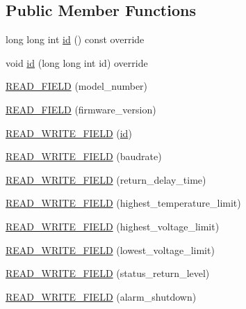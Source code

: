 \subsection*{Public Member Functions}
\begin{DoxyCompactItemize}
\item 
long long int \hyperlink{classdynamixel_1_1servos_1_1_servo_a2d022081672e25a7bb57b76706e1cc57}{id} () const override
\item 
void \hyperlink{classdynamixel_1_1servos_1_1_servo_a866e0cdb2ee9f3c622305634368b18f2}{id} (long long int id) override
\item 
\hyperlink{classdynamixel_1_1servos_1_1_servo_a1e066990c79024cc63d7e5ac53fcf51b}{R\+E\+A\+D\+\_\+\+F\+I\+E\+L\+D} (model\+\_\+number)
\item 
\hyperlink{classdynamixel_1_1servos_1_1_servo_a1331b1d5876dc2bc640194aff7d5be34}{R\+E\+A\+D\+\_\+\+F\+I\+E\+L\+D} (firmware\+\_\+version)
\item 
\hyperlink{classdynamixel_1_1servos_1_1_servo_a6ac8b76a420b2b576231f71bd5c0c3bb}{R\+E\+A\+D\+\_\+\+W\+R\+I\+T\+E\+\_\+\+F\+I\+E\+L\+D} (\hyperlink{classdynamixel_1_1servos_1_1_servo_a2d022081672e25a7bb57b76706e1cc57}{id})
\item 
\hyperlink{classdynamixel_1_1servos_1_1_servo_a5960b4dc9b4fb5013ceb5790d241429c}{R\+E\+A\+D\+\_\+\+W\+R\+I\+T\+E\+\_\+\+F\+I\+E\+L\+D} (baudrate)
\item 
\hyperlink{classdynamixel_1_1servos_1_1_servo_a48eb1bdd305f5db2b326f187708f95d8}{R\+E\+A\+D\+\_\+\+W\+R\+I\+T\+E\+\_\+\+F\+I\+E\+L\+D} (return\+\_\+delay\+\_\+time)
\item 
\hyperlink{classdynamixel_1_1servos_1_1_servo_a0cc74d325cb6326c6bb877467a77d035}{R\+E\+A\+D\+\_\+\+W\+R\+I\+T\+E\+\_\+\+F\+I\+E\+L\+D} (highest\+\_\+temperature\+\_\+limit)
\item 
\hyperlink{classdynamixel_1_1servos_1_1_servo_a2cebb6bb933ce04c08954a1d28024be6}{R\+E\+A\+D\+\_\+\+W\+R\+I\+T\+E\+\_\+\+F\+I\+E\+L\+D} (highest\+\_\+voltage\+\_\+limit)
\item 
\hyperlink{classdynamixel_1_1servos_1_1_servo_a05bb43c819899c966245b2bd3efdd3cd}{R\+E\+A\+D\+\_\+\+W\+R\+I\+T\+E\+\_\+\+F\+I\+E\+L\+D} (lowest\+\_\+voltage\+\_\+limit)
\item 
\hyperlink{classdynamixel_1_1servos_1_1_servo_adff1f1c1cab4ff1313f38801dd793b84}{R\+E\+A\+D\+\_\+\+W\+R\+I\+T\+E\+\_\+\+F\+I\+E\+L\+D} (status\+\_\+return\+\_\+level)
\item 
\hyperlink{classdynamixel_1_1servos_1_1_servo_a282f154ebc133a075fbb32b0497fbac7}{R\+E\+A\+D\+\_\+\+W\+R\+I\+T\+E\+\_\+\+F\+I\+E\+L\+D} (alarm\+\_\+shutdown)

\end{DoxyCompactItemize}

